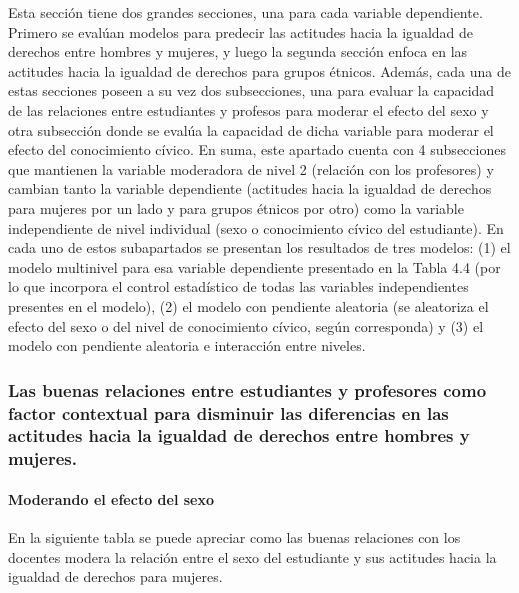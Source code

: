\documentclass[12pt,twoside]{templates/facsothesis}
\begin{document}
Esta sección tiene dos grandes secciones, una para cada variable dependiente. Primero se evalúan modelos para predecir las actitudes hacia la igualdad de derechos entre hombres y mujeres, y luego la segunda sección enfoca en las actitudes hacia la igualdad de derechos para grupos étnicos. Además, cada una de estas secciones poseen a su vez dos subsecciones, una para evaluar la capacidad de las relaciones entre estudiantes y profesos para moderar el efecto del sexo y otra subsección donde se evalúa la capacidad de dicha variable para moderar el efecto del conocimiento cívico. En suma, este apartado cuenta con 4 subsecciones que mantienen la variable moderadora de nivel 2 (relación con los profesores) y cambian tanto la variable dependiente (actitudes hacia la igualdad de derechos para mujeres por un lado y para grupos étnicos por otro) como la variable independiente de nivel individual (sexo o conocimiento cívico del estudiante). En cada uno de estos subapartados se presentan los resultados de tres modelos: (1) el modelo multinivel para esa variable dependiente presentado en la Tabla 4.4 (por lo que incorpora el control estadístico de todas las variables independientes presentes en el modelo), (2) el modelo con pendiente aleatoria (se aleatoriza el efecto del sexo o del nivel de conocimiento cívico, según corresponda) y (3) el modelo con pendiente aleatoria e interacción entre niveles.

\hypertarget{las-buenas-relaciones-entre-estudiantes-y-profesores-como-factor-contextual-para-disminuir-las-diferencias-en-las-actitudes-hacia-la-igualdad-de-derechos-entre-hombres-y-mujeres.}{%
\subsubsection{Las buenas relaciones entre estudiantes y profesores como factor contextual para disminuir las diferencias en las actitudes hacia la igualdad de derechos entre hombres y mujeres.}\label{las-buenas-relaciones-entre-estudiantes-y-profesores-como-factor-contextual-para-disminuir-las-diferencias-en-las-actitudes-hacia-la-igualdad-de-derechos-entre-hombres-y-mujeres.}}

\hypertarget{moderando-el-efecto-del-sexo}{%
\paragraph{Moderando el efecto del sexo}\label{moderando-el-efecto-del-sexo}}

En la siguiente tabla se puede apreciar como las buenas relaciones con los docentes modera la relación entre el sexo del estudiante y sus actitudes hacia la igualdad de derechos para mujeres.
\end{document}
